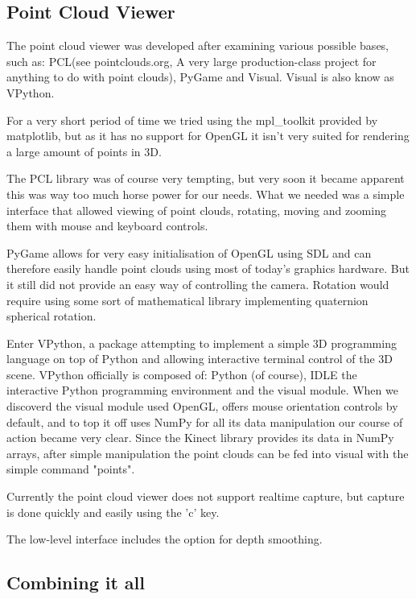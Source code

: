 \subsection{Point Cloud Viewer}

The point cloud viewer was developed after examining various possible
bases, such as: PCL(see pointclouds.org, A very large production-class project for
anything to do with point clouds), PyGame and Visual. Visual is also know
as VPython.

For a very short period of time we tried using the mpl\_toolkit provided
by matplotlib, but as it has no support for OpenGL it isn't very suited
for rendering a large amount of points in 3D.

The PCL library was of course
very tempting, but very soon it became apparent this was way too much horse
power for our needs. What we needed was a simple interface that allowed viewing
of point clouds, rotating, moving and zooming them with mouse and keyboard
controls.

PyGame allows for very easy initialisation of OpenGL using SDL and can therefore
easily handle point clouds using most of today's graphics hardware. But it still
did not provide an easy way of controlling the camera. Rotation would require
using some sort of mathematical library implementing quaternion spherical rotation.

Enter VPython, a package attempting to implement a simple 3D programming
language on top of Python and allowing interactive terminal control of the
3D scene. VPython officially is composed of: Python (of course), IDLE the
interactive Python programming environment and the visual module. When we
discoverd the visual module used OpenGL, offers mouse orientation
controls by default, and to top it off uses NumPy for all its data manipulation
our course of action became very clear. Since the Kinect library provides its
data in NumPy arrays, after simple manipulation the point clouds can be fed into
visual with the simple command "points".

Currently the point cloud viewer does not support realtime capture, but capture
is done quickly and easily using the 'c' key.


The low-level interface includes the option for depth smoothing.

\subsection{Combining it all}
